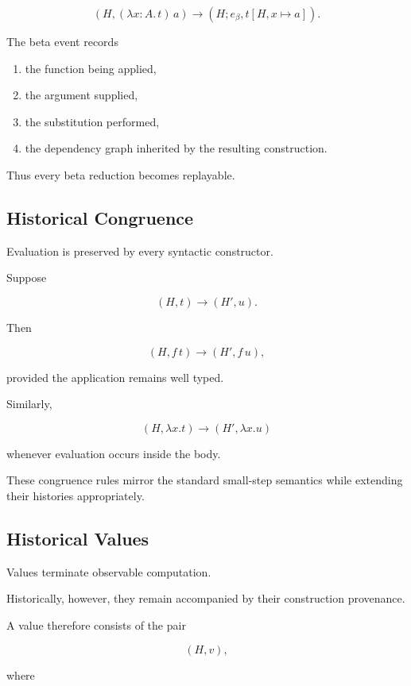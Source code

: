 \documentclass[12pt,oneside]{article}
\theoremstyle{definition}
\theoremstyle{remark}
\begin{document}
\[
(H,
(\lambda x:A.\,t)\,a)
\longrightarrow
(H;e_\beta,
t[H,x\mapsto a]).
\]

The beta event records

\begin{enumerate}

\item
the function being applied,

\item
the argument supplied,

\item
the substitution performed,

\item
the dependency graph inherited by the resulting construction.

\end{enumerate}

Thus every beta reduction becomes replayable.

\subsection{Historical Congruence}

Evaluation is preserved by every syntactic constructor.

Suppose

\[
(H,t)
\longrightarrow
(H',u).
\]

Then

\[
(H,f\,t)
\longrightarrow
(H',f\,u),
\]

provided the application remains well typed.

Similarly,

\[
(H,\lambda x.t)
\longrightarrow
(H',\lambda x.u)
\]

whenever evaluation occurs inside the body.

These congruence rules mirror the standard small-step semantics while extending
their histories appropriately.

\subsection{Historical Values}

Values terminate observable computation.

Historically, however, they remain accompanied by their construction
provenance.

A value therefore consists of the pair

\[
(H,v),
\]

where
\end{document}
